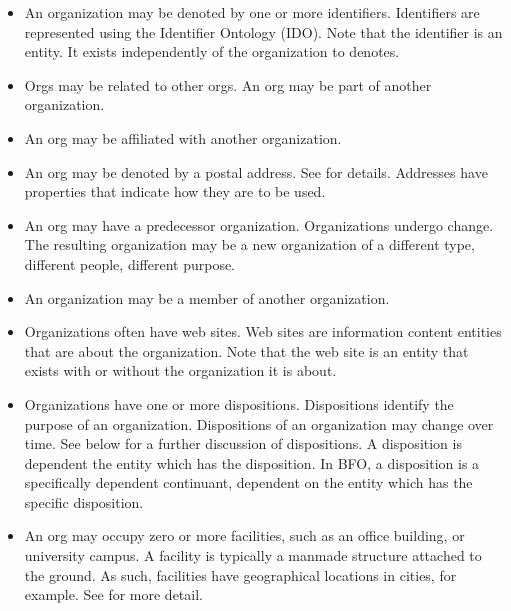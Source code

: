 \documentclass[letterpaper,10pt,english]{sphinxmanual}
\begin{document}
\begin{itemize}
\item {} 
\sphinxAtStartPar
An organization may be denoted by one or more identifiers.  Identifiers are represented
using the Identifier Ontology (IDO).  Note that the identifier is an entity.  It exists
independently of the organization to denotes.

\item {} 
\sphinxAtStartPar
Orgs may be related to other orgs.  An org may be part of another organization.

\item {} 
\sphinxAtStartPar
An org may be affiliated with another organization.

\item {} 
\sphinxAtStartPar
An org may be denoted by a postal address.  See {\hyperref[\detokenize{addresses::doc}]{}} for
details.  Addresses have
properties that indicate how they are to be used.

\item {} 
\sphinxAtStartPar
An org may have a predecessor organization.  Organizations undergo change.  The
resulting
organization may be a new organization of a different type, different people, different
purpose.

\item {} 
\sphinxAtStartPar
An organization may be a member of another organization.

\item {} 
\sphinxAtStartPar
Organizations often have web sites.  Web sites are information content entities that are
about the organization.  Note that the web site is an entity that exists with or without
the organization it is about.

\item {} 
\sphinxAtStartPar
Organizations have one or more dispositions.  Dispositions identify the purpose of an
organization.  Dispositions of an organization may change over time.  See below for a
further discussion of dispositions.  A disposition is dependent the entity which
has the disposition.  In BFO, a disposition is a specifically dependent continuant,
dependent on the entity which has the specific disposition.

\item {} 
\sphinxAtStartPar
An org may occupy zero or more facilities, such as an office building, or university
campus. A facility
is typically a man\sphinxhyphen{}made structure attached to the ground.  As such, facilities have
geographical locations \textendash{} in cities, for example.  See {\hyperref[\detokenize{facilities::doc}]{}}
for more detail.


\end{itemize}
\end{document}
